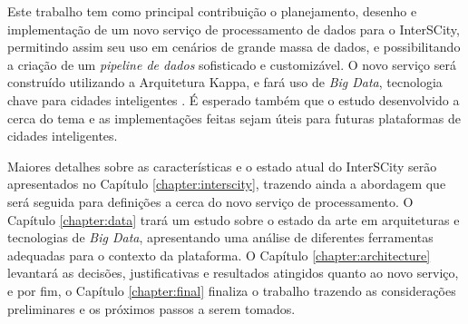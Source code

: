 Este trabalho tem como principal contribuição o planejamento, desenho e
implementação de um novo serviço de processamento de dados para o InterSCity,
permitindo assim seu uso em cenários de grande massa de dados, e possibilitando
a criação de um \textit{pipeline de dados} sofisticado e customizável. O novo
serviço será construído utilizando a Arquitetura Kappa, e fará uso de
\textit{Big Data}, tecnologia chave para cidades inteligentes
\cite{batty2012smart}. É esperado também que o estudo desenvolvido a cerca do
tema e as implementações feitas sejam úteis para futuras plataformas de cidades
inteligentes.

Maiores detalhes sobre as características e o estado atual do InterSCity serão
apresentados no Capítulo \ref{chapter:interscity}, trazendo ainda a abordagem que será
seguida para definições a cerca do novo serviço de processamento. O Capítulo
\ref{chapter:data} trará um estudo sobre o estado da arte em arquiteturas e
tecnologias de \textit{Big Data}, apresentando uma análise de diferentes ferramentas
adequadas para o contexto da plataforma. O Capítulo \ref{chapter:architecture}
levantará as decisões, justificativas e resultados atingidos quanto ao novo
serviço, e por fim, o Capítulo \ref{chapter:final} finaliza o trabalho
trazendo as considerações preliminares e os próximos passos a serem tomados.
